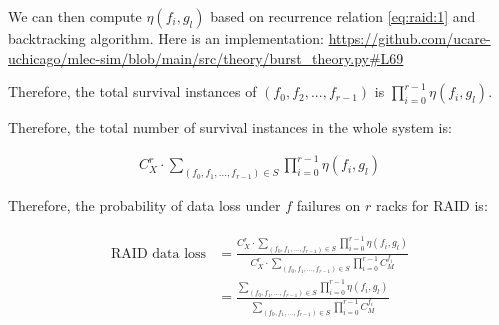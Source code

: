\documentclass{article}
\begin{document}
We can then compute $\eta(f_i, g_l)$ based on recurrence relation \ref{eq:raid:1} and backtracking algorithm. Here is an implementation: \url{https://github.com/ucare-uchicago/mlec-sim/blob/main/src/theory/burst_theory.py#L69}

Therefore, the total survival instances of $(f_0, f_2, ..., f_{r-1})$ is $\prod_{i=0}^{r-1} \eta(f_i, g_l)$.

Therefore, the total number of survival instances in the whole system is:

\begin{eqnarray}
C_{X}^{r} \cdot \sum_{(f_0, f_1, ..., f_{r-1}) \in S} \prod_{i=0}^{r-1} \eta(f_i, g_l)
\label{eq:raid:2}
\end{eqnarray}

Therefore, the probability of data loss under $f$ failures on $r$ racks for RAID is:

\begin{eqnarray}
\begin{aligned}
\text{RAID data loss} &= \frac{C_{X}^{r} \cdot \sum_{(f_0, f_1, ..., f_{r-1}) \in S} \prod_{i=0}^{r-1} \eta(f_i, g_l)} 
{C_{X}^{r} \cdot \sum_{(f_0, f_1, ..., f_{r-1}) \in S} \prod_{i=0}^{r-1}C_{M}^{f_i}}\\
&= \frac{ \sum_{(f_0, f_1, ..., f_{r-1}) \in S} \prod_{i=0}^{r-1} \eta(f_i, g_l)} 
{\sum_{(f_0, f_1, ..., f_{r-1}) \in S} \prod_{i=0}^{r-1}C_{M}^{f_i}}
\end{aligned}
\label{eq:raid:3}
\end{eqnarray}
\end{document}
